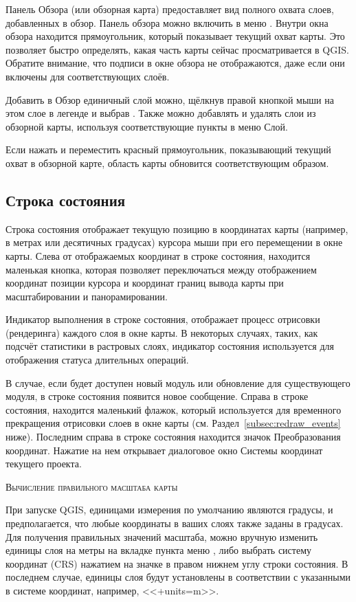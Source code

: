 Панель Обзора (или обзорная карта) предоставляет вид полного охвата слоев,
добавленных в обзор. Панель обзора можно включить в меню
 \arrow {}. Внутри окна обзора
находится прямоугольник, который показывает текущий охват карты. Это позволяет
быстро определять, какая часть карты сейчас просматривается в QGIS. Обратите
внимание, что подписи в окне обзора не отображаются, даже если они включены для
соответствующих слоёв.

Добавить в Обзор единичный слой можно, щёлкнув правой кнопкой мыши на этом
слое в легенде и выбрав . Также можно
добавлять и удалять слои из обзорной карты, используя соответствующие
пункты в меню Слой.

Если нажать и переместить красный прямоугольник, показывающий текущий охват
в обзорной карте, область карты обновится соответствующим образом.

\subsection{Строка состояния}\label{label_statusbar}

Строка состояния отображает текущую позицию в координатах карты (например,
в метрах или десятичных градусах) курсора мыши при его перемещении в окне
карты. Слева от отображаемых координат в строке состояния, находится
маленькая кнопка, которая позволяет переключаться между отображением
координат позиции курсора и координат границ вывода карты при
масштабировании и панорамировании.

Индикатор выполнения в строке состояния, отображает процесс отрисовки
(рендеринга) каждого слоя в окне карты. В некоторых случаях, таких, как
подсчёт статистики в растровых слоях, индикатор состояния используется
для отображения статуса длительных операций.

В случае, если будет доступен новый модуль или обновление для
существующего модуля, в строке состояния появится новое сообщение. Справа
в строке состояния, находится маленький флажок, который используется для
временного прекращения отрисовки слоев в окне карты
(см. Раздел~\ref{subsec:redraw_events} ниже). Последним справа в строке
состояния находится значок Преобразования координат. Нажатие на нем
открывает диалоговое окно Системы координат текущего проекта.

\begin{Tip}\caption{\textsc{Вычисление правильного масштаба карты}}
При запуске QGIS, единицами измерения по умолчанию являются градусы, и предполагается,
что любые координаты в ваших слоях также заданы в градусах. Для
получения правильных значений масштаба, можно вручную изменить единицы
слоя на метры на вкладке  пункта меню 
\arrow {}, либо выбрать систему
координат (CRS) нажатием на значке
 в правом
нижнем углу строки состояния. В последнем случае, единицы слоя
будут установлены в соответствии с указанными в системе координат,
например, <<+units=m>>.
\end{Tip}

